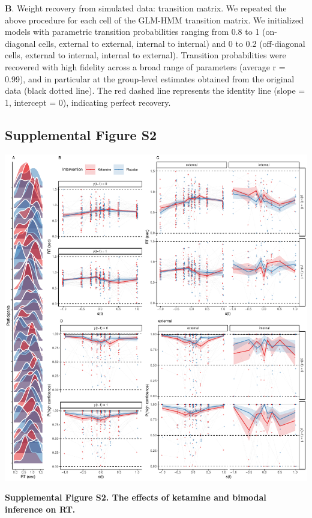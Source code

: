 \documentclass[
]{article}
\begin{document}
\textbf{B}. Weight recovery from simulated data: transition matrix. We
repeated the above procedure for each cell of the GLM-HMM transition
matrix. We initialized models with parametric transition probabilities
ranging from 0.8 to 1 (on-diagonal cells, external to external, internal
to internal) and 0 to 0.2 (off-diagonal cells, external to internal,
internal to external). Transition probabilities were recovered with high
fidelity across a broad range of parameters (average r = 0.99), and in
particular at the group-level estimates obtained from the original data
(black dotted line). The red dashed line represents the identity line
(slope = 1, intercept = 0), indicating perfect recovery.

\newpage

\subsection{Supplemental Figure S2}\label{supplemental-figure-s2}

\includegraphics{modes_ketamine_scz_files/figure-latex/Supplemental_Figure_S2-1.pdf}

\textbf{Supplemental Figure S2. The effects of ketamine and bimodal
inference on RT.}
\end{document}
